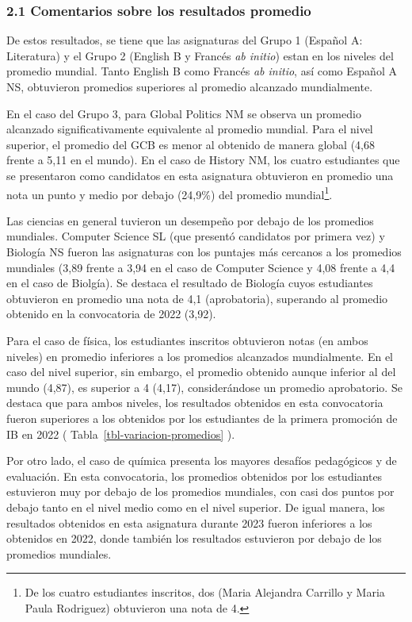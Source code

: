 \documentclass[
  letterpaper,
  DIV=11,
  numbers=noendperiod]{scrartcl}
\begin{document}
\hypertarget{comentarios-sobre-los-resultados-promedio}{%
\subsubsection{2.1 Comentarios sobre los resultados
promedio}\label{comentarios-sobre-los-resultados-promedio}}

De estos resultados, se tiene que las asignaturas del Grupo 1 (Español
A: Literatura) y el Grupo 2 (English B y Francés \emph{ab initio}) estan
en los niveles del promedio mundial. Tanto English B como Francés
\emph{ab initio}, así como Español A NS, obtuvieron promedios superiores
al promedio alcanzado mundialmente.

En el caso del Grupo 3, para Global Politics NM se observa un promedio
alcanzado significativamente equivalente al promedio mundial. Para el
nivel superior, el promedio del GCB es menor al obtenido de manera
global (4,68 frente a 5,11 en el mundo). En el caso de History NM, los
cuatro estudiantes que se presentaron como candidatos en esta asignatura
obtuvieron en promedio una nota un punto y medio por debajo (24,9\%) del
promedio mundial\footnote{De los cuatro estudiantes inscritos, dos
  (Maria Alejandra Carrillo y Maria Paula Rodriguez) obtuvieron una nota
  de 4.}.

Las ciencias en general tuvieron un desempeño por debajo de los
promedios mundiales. Computer Science SL (que presentó candidatos por
primera vez) y Biología NS fueron las asignaturas con los puntajes más
cercanos a los promedios mundiales (3,89 frente a 3,94 en el caso de
Computer Science y 4,08 frente a 4,4 en el caso de Biolgía). Se destaca
el resultado de Biología cuyos estudiantes obtuvieron en promedio una
nota de 4,1 (aprobatoria), superando al promedio obtenido en la
convocatoria de 2022 (3,92).

Para el caso de física, los estudiantes inscritos obtuvieron notas (en
ambos niveles) en promedio inferiores a los promedios alcanzados
mundialmente. En el caso del nivel superior, sin embargo, el promedio
obtenido aunque inferior al del mundo (4,87), es superior a 4 (4,17),
considerándose un promedio aprobatorio. Se destaca que para ambos
niveles, los resultados obtenidos en esta convocatoria fueron superiores
a los obtenidos por los estudiantes de la primera promoción de IB en
2022 ( Tabla~\ref{tbl-variacion-promedios} ).

Por otro lado, el caso de química presenta los mayores desafíos
pedagógicos y de evaluación. En esta convocatoria, los promedios
obtenidos por los estudiantes estuvieron muy por debajo de los promedios
mundiales, con casi dos puntos por debajo tanto en el nivel medio como
en el nivel superior. De igual manera, los resultados obtenidos en esta
asignatura durante 2023 fueron inferiores a los obtenidos en 2022, donde
también los resultados estuvieron por debajo de los promedios mundiales.
\end{document}

